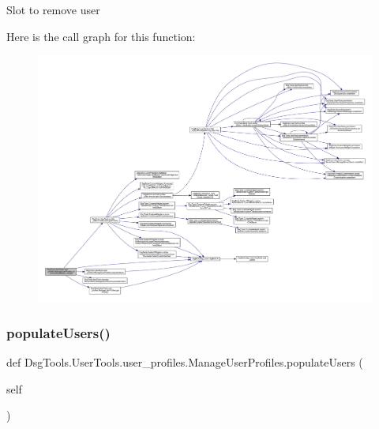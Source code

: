 \begin{DoxyVerb}Slot to remove user
\end{DoxyVerb}
 Here is the call graph for this function\+:
\nopagebreak
\begin{figure}[H]
\begin{center}
\leavevmode
\includegraphics[width=350pt]{class_dsg_tools_1_1_user_tools_1_1user__profiles_1_1_manage_user_profiles_a77ef40627addf8820512fc30a2d01ae2_cgraph}
\end{center}
\end{figure}
\mbox{\label{class_dsg_tools_1_1_user_tools_1_1user__profiles_1_1_manage_user_profiles_aa6fc0358355aa3103a1186f1ee803757}} 
\subsubsection{\texorpdfstring{populate\+Users()}{populateUsers()}}
{\footnotesize\ttfamily def Dsg\+Tools.\+User\+Tools.\+user\+\_\+profiles.\+Manage\+User\+Profiles.\+populate\+Users (\begin{DoxyParamCaption}\item[{}]{self }\end{DoxyParamCaption})}

